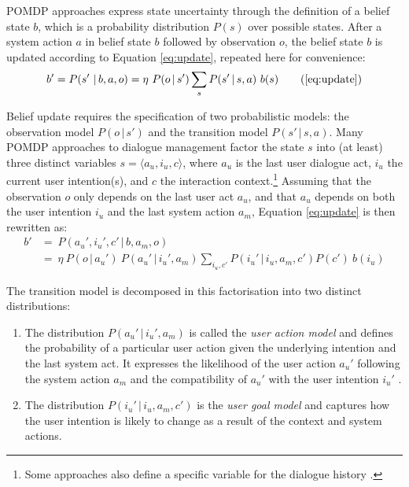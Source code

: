 POMDP approaches express state uncertainty through the definition of a belief state $b$, which is a probability distribution $P(s)$ over possible states.  After a system action $a$ in belief state $b$ followed by observation $o$, the belief state $b$ is updated according to Equation \eqref{eq:update}, repeated here for convenience:
\begin{align}
b' = P(s'\ | \, b, a,o) = \eta \ P(o\, |\, s') \sum_{s} P(s'\, |\, s,a) \ b(s)   \tag{\ref{eq:update}}
\end{align}

Belief update requires the specification of two probabilistic models: the observation model $P(o\, |\, s')$ and the transition model $P(s'\, |\, s,a)$. Many POMDP approaches to dialogue management factor the state $s$ into (at least) three distinct variables $s = \langle a_u, i_u, c \rangle$, where $a_u$ is the last user dialogue act, $i_u$ the current user intention(s), and $c$ the interaction context.\footnote{Some approaches also define a specific variable for the dialogue history \citep{Young:2010}.}   Assuming that the observation $o$ only depends on the last user act $a_u$, and that $a_u$ depends on both the user intention $i_u$ and the last system action $a_m$, Equation \eqref{eq:update} is then rewritten as:
\begin{align}
b' & = \ P(a_u', i_u', c' \, | \, b, a_m,o)\\
& = \ \eta \ P(o \, | \, a_u') \ P(a_u' \, | \, i_u', a_m) \sum_{i_u, c'} P(i_u' \, | \, i_u,a_m, c') P(c') \ b(i_u) \label{eq:update2}
\end{align}

The transition model is decomposed in this factorisation into two distinct distributions: \begin{enumerate}
\item  The distribution $P(a_u' \, | \, i_u', a_m)$ is called the \textit{user action model} and defines the probability of a particular user action given the underlying intention and the last system act.  It expresses the likelihood of the user action $a_u'$ following the system action $a_m$ and the compatibility of $a_u'$ with the user intention $i_u'$ \citep{Young:2010}.
\item The distribution $P(i_u' \, | \, i_u, a_m, c')$ is the \textit{user goal model} and captures how the user intention is likely to change as a result of the context and system actions.  
\end{enumerate}

